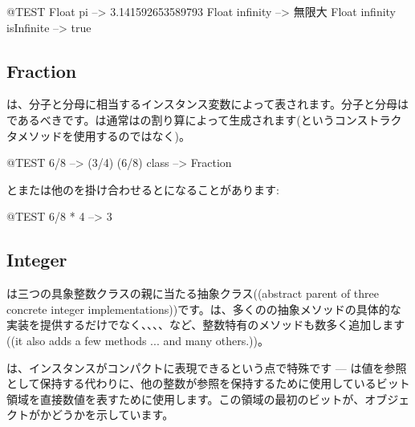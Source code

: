 \documentclass[a4paper,10pt,twoside]{book}
\begin{document}
\begin{code}{@TEST}
Float pi                      --> 3.141592653589793
Float infinity               --> 無限大
Float infinity isInfinite --> true
\end{code}

\subsection{Fraction}

は、分子と分母に相当するインスタンス変数によって表されます。分子と分母はであるべきです。は通常はの割り算によって生成されます(というコンストラクタメソッドを使用するのではなく)。

\begin{code}{@TEST}
6/8             --> (3/4)
(6/8) class --> Fraction
\end{code}

とまたは他のを掛け合わせるとになることがあります:

\begin{code}{@TEST}
6/8 * 4 --> 3
\end{code}


\subsection{Integer}

は三つの具象整数クラスの親に当たる抽象クラス((abstract parent of three concrete integer implementations))です。は、多くのの抽象メソッドの具体的な実装を提供するだけでなく、、、、など、整数特有のメソッドも数多く追加します((it also adds a few methods ... and many others.))。

は、インスタンスがコンパクトに表現できるという点で特殊です --- は値を参照として保持する代わりに、他の整数が参照を保持するために使用しているビット領域を直接数値を表すために使用します。この領域の最初のビットが、オブジェクトがかどうかを示しています。
\end{document}
